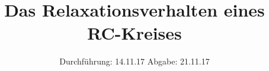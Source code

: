 

\subject{V353}
\title{Das Relaxationsverhalten eines RC-Kreises}
\date{
  Durchführung: 14.11.17
  \hspace{3em}
  Abgabe: 21.11.17
}



\maketitle
\thispagestyle{empty}
\tableofcontents
\newpage








\newpage
\printbibliography


